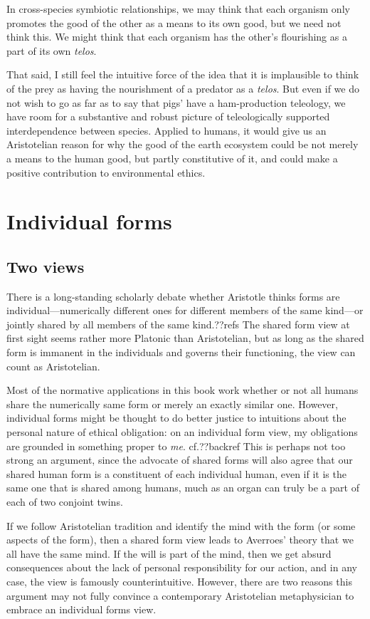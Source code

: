 In cross-species symbiotic relationships, we may think that each organism only promotes the good of the 
other as a means to its own good, but we need not think this. We might think that each organism has the
other's flourishing as a part of its own \textit{telos}. 

That said, I still feel the intuitive force of the idea that it is implausible to think of the prey as having the
nourishment of a predator as a \textit{telos}. But even if we do not wish to go as far as to say that pigs'
have a ham-production teleology, we have room for a substantive and robust picture of teleologically supported
interdependence between species. Applied to humans, it would give us an Aristotelian reason for why the good of the earth ecosystem 
could be not merely a means to the human good, but partly constitutive of it, and could make a positive
contribution to environmental ethics. 

\section{Individual forms}
\subsection{Two views}
There is a long-standing scholarly debate whether Aristotle thinks forms are individual---numerically different ones for different members of 
the same kind---or jointly shared by all members of the same kind.??refs The shared form view at first sight seems rather 
more Platonic than Aristotelian, but as long as the shared form is immanent in the individuals and governs their functioning,
the view can count as Aristotelian. 

Most of the normative applications in this book work whether or not all humans share the numerically same form or merely 
an exactly similar one. However, individual forms might be thought to do better justice to intuitions about the personal 
nature of ethical obligation: on an individual form view, my obligations are grounded in something proper to \textit{me}. cf.??backref This is perhaps not too strong an argument, since the advocate of shared forms will also agree that our 
shared human form is a constituent of each individual human, even if it is the same one that is shared among humans, much 
as an organ can truly be a part of each of two conjoint twins. 

If we follow Aristotelian tradition and identify the mind with the form (or some aspects of the form), then a shared form 
view leads to Averroes' theory that we all have the same mind. If the will is part of the mind, then we get absurd consequences
about the lack of personal responsibility for our action, and in any case, the view is famously counterintuitive. However, 
there are two reasons this argument may not fully convince a contemporary Aristotelian metaphysician to embrace an individual
forms view. 

